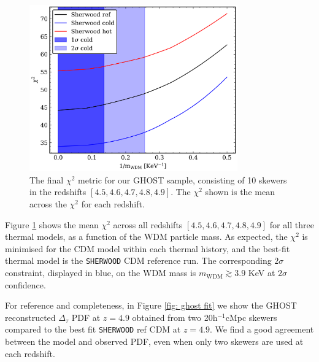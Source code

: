 \begin{figure}[ht!]
    \centering
    \includegraphics[width=0.8\textwidth]{img/ML/GHOST_chi.png}
    \caption{The final $\chi^2$ metric for our GHOST sample, consisting of 10 skewers in the redshifts $[4.5, 4.6, 4.7, 4.8, 4.9]$. The $\chi^2$ shown is the mean across the $\chi^2$ for each redshift.}
    \label{fig: ghost chi}
\end{figure}
Figure \ref{fig: ghost chi} shows the mean $\chi^2$ across all redshifts $[4.5, 4.6, 4.7, 4.8, 4.9]$ for all three thermal models, as a function of the WDM particle mass. As expected, the $\chi^2$ is minimised for the CDM model within each thermal history, and the best-fit thermal model is the \texttt{SHERWOOD} CDM reference run. The corresponding $2\sigma$ constraint, displayed in blue, on the WDM mass is $m_{\mathrm{WDM}} \gtrsim 3.9$ KeV at $2\sigma$ confidence.

For reference and completeness, in Figure \ref{fig: ghost fit} we show the GHOST reconstructed $\Delta_\tau$ PDF at $z=4.9$ obtained from two 20h$^{-1}$cMpc skewers compared to the best fit \texttt{SHERWOOD} ref CDM at $z=4.9$. We find a good agreement between the model and observed PDF, even when only two skewers are used at each redshift.

